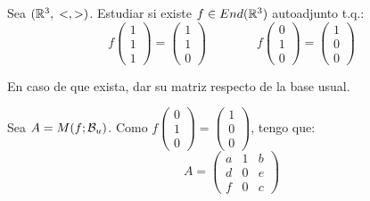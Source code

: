 \begin{ejercicio}
\begin{enumerate}
\begin{enumerate}
        

    \end{enumerate}

    
\end{enumerate}
    
\end{ejercicio}

\begin{ejercicio}
    Sea $(\mathbb{R}^3,\;<,>)$. Estudiar si existe $f\in End(\mathbb{R}^3)$ autoadjunto t.q.:
    \begin{equation*}
        f\left(\begin{array}{c}
            1 \\ 1 \\ 1
        \end{array} \right) = \left(\begin{array}{c}
            1 \\ 1 \\ 0
        \end{array} \right)
        \qquad\qquad
        f\left(\begin{array}{c}
            0 \\ 1 \\ 0
        \end{array} \right) =
        \left(\begin{array}{c}
            1 \\ 0 \\ 0
        \end{array} \right)
    \end{equation*}

    En caso de que exista, dar su matriz respecto de la base usual.

    Sea $A=M(f;\mathcal{B}_u)$. Como $f\left(\begin{array}{c}
            0 \\ 1 \\ 0
        \end{array} \right) =
        \left(\begin{array}{c}
            1 \\ 0 \\ 0
        \end{array} \right)$, tengo que:
        \begin{equation*}
            A = \left(\begin{array}{ccc}
                a & 1 & b \\
                d & 0 & e \\
                f & 0 & c
            \end{array}\right)
        \end{equation*}


\end{ejercicio}
